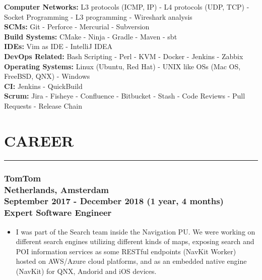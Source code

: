 \documentclass[10pt,a4paper]{article}
\begin{document}
\textbullet \hspace{0.1cm}\textbf{Computer Networks:} L3 protocols (ICMP, IP) - L4 protocols (UDP, TCP) - Socket Programming - L3 programming - Wireshark analysis \\
\textbullet \hspace{0.1cm}\textbf{SCMs:} Git - Perforce - Mercurial - Subversion \\
\textbullet \hspace{0.1cm}\textbf{Build Systems:} CMake - Ninja - Gradle - Maven - sbt \\
\textbullet \hspace{0.1cm}\textbf{IDEs:} Vim as IDE - IntelliJ IDEA \\
\textbullet \hspace{0.1cm}\textbf{DevOps Related:} Bash Scripting - Perl - KVM - Docker - Jenkins - Zabbix \\
\textbullet \hspace{0.1cm}\textbf{Operating Systems:} Linux (Ubuntu, Red Hat) - UNIX like OSs (Mac OS, FreeBSD, QNX) - Windows \\
\textbullet \hspace{0.1cm}\textbf{CI:} Jenkins - QuickBuild \\
\textbullet \hspace{0.1cm}\textbf{Scrum:} Jira - Fisheye - Confluence - Bitbucket - Stash - Code Reviews - Pull Requests - Release Chain

\section{CAREER}
\noindent \rule {18.0cm}{0.2pt}
\subsubsection{{ \textbullet \hspace{0.1cm} \large TomTom} \\
\textnormal{Netherlands, Amsterdam} \\
\textnormal{September 2017 - December 2018 (1 year, 4 months)} \\
{Expert Software Engineer}}
  \setlength{\leftskip}{0.5cm}
  \setlength{\rightskip}{1cm}
  \begin{itemize}
    \setlength{\rightskip}{1cm}
    \setlength\itemsep{0em}
    \item I was part of the Search team inside the Navigation PU. We were working on different search engines utilizing different kinds of maps, exposing search and POI information services as some RESTful endpoints (NavKit Worker) hosted on AWS/Azure cloud platforms, and as an embedded native engine (NavKit) for QNX, Andorid and iOS devices.
  \end{itemize}
  \setlength{\leftskip}{0pt}
  \setlength{\rightskip}{0cm}
\end{document}
